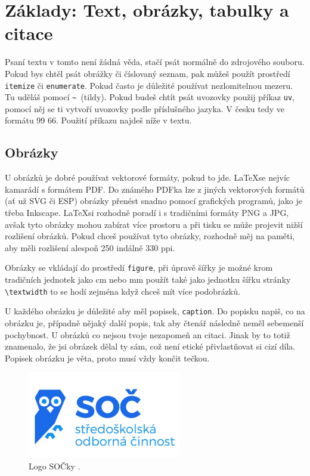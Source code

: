 \documentclass[12pt, a4paper,
 twoside,        %
 openright
]{report}
\begin{document}
\section[Základy]{Základy: Text, obrázky, tabulky a citace}
Psaní textu v tomto není žádná věda, stačí psát normálně do zdrojového souboru. Pokud bys chtěl psát obrážky či číslovaný seznam, pak můžeš použít prostředí \texttt{itemize} či \texttt{enumerate}. Pokud často je důležité používat nezlomitelnou mezeru. Tu uděláš pomocí \verb|~|~(tildy). Pokud budeš chtít psát uvozovky použij příkaz \texttt{uv}, pomocí něj se ti vytvoří uvozovky podle příslušného jazyka. V česku tedy ve formátu 99 66. Použití příkazu najdeš níže v textu.

\subsection{Obrázky}

U obrázků je dobré používat vektorové formáty, pokud to jde. \LaTeX se nejvíc kamarádí s formátem PDF. Do známého PDFka lze z jiných vektorových formátů (ať už SVG či ESP) obrázky přenést snadno pomocí grafických programů, jako je třeba Inkscape. \LaTeX si rozhodně poradí i s tradičními formáty PNG a JPG, avšak tyto obrázky mohou zabírat více prostoru a při tisku se může projevit nižší rozlišení obrázků. Pokud chceš používat tyto obrázky, rozhodně měj na paměti, aby měli rozlišení alespoň 250 indálně 330 ppi.

Obrázky se vkládají do prostředí \texttt{figure}, při úpravě šířky je možné krom tradičních jednotek jako cm nebo mm použít také jako jednotku šířku stránky \verb|\textwidth| to se hodí zejména když chceš mít více podobrázků. 

U každého obrázku je důležité aby měl popisek, \texttt{caption}. Do popisku napiš, co na obrázku je, případně nějaký další popis, tak aby čtenář následně neměl sebemenší pochybnost. U obrázků co nejsou tvoje nezapomeň an citaci. Jinak by to totiž znamenalo, že jsi obrázek dělal ty sám, což není etické přivlastňovat si cizí díla. Popisek obrázku je věta, proto musí vždy končit tečkou.

\begin{figure}[h]
    \centering
    \includegraphics[width=0.6\textwidth]{imgs/soc-logo.jpg}
    \caption{Logo SOČky \cite{socLogo}.}
    \label{fig:logoSOC}
\end{figure}
\end{document}
